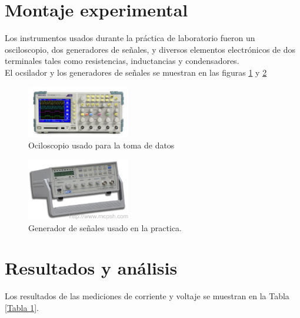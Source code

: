 \documentclass[prb,aps,twocolumn,preprintnumbers,amsmath,amssymb]{revtex4}
\begin{document}
\section{Montaje experimental}

Los instrumentos usados durante la práctica de laboratorio fueron un osciloscopio, dos generadores de señales, y diversos elementos electrónicos de dos terminales tales como resistencias, inductancias y condensadores.\\

El ocsilador y los generadores de señales se muestran en las figuras \ref{fig: osci} y \ref{fig: genr}

\begin{figure}[h!]
	\centering
	\includegraphics[width=0.4\textwidth]{osciloscopio}
	\caption{Ociloscopio usado para la toma de datos}
	\label{fig: osci}
\end{figure}

\begin{figure}[h!]
	\centering
	\includegraphics[width=0.4\textwidth]{generador}
	\caption{Generador de señales usado en la practica.}
	\label{fig: genr}
\end{figure}

\section{Resultados y análisis}

Los resultados de las mediciones de corriente y voltaje se muestran en la Tabla \ref{Tabla 1}.\\
\end{document}

